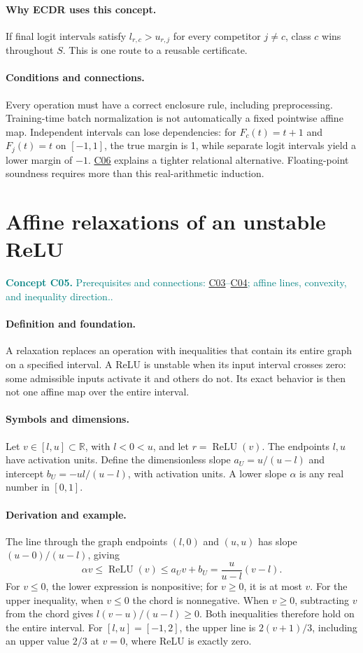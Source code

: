 \documentclass[11pt,a4paper]{article}
\newcommand{\R}{\mathbb R}
\newcommand{\relu}{\operatorname{ReLU}}
\newcommand{\conceptid}{Front matter}
\newcommand{\concept}[3]{\clearpage\renewcommand{\conceptid}{#1}%
\section{#2}\label{concept:#1}%
\textcolor{teal}{\textbf{Concept #1.} Prerequisites and connections: #3.}\par
\typeout{ECDR-CONCEPT-START #1 PAGE=\thepage}}
\begin{document}
\paragraph{Why ECDR uses this concept.}
If final logit intervals satisfy $l_{r,c}>u_{r,j}$ for every competitor $j\ne c$, class $c$ wins throughout $S$. This is one route to a reusable certificate.
\paragraph{Conditions and connections.}
Every operation must have a correct enclosure rule, including preprocessing. Training-time batch normalization is not automatically a fixed pointwise affine map. Independent intervals can lose dependencies: for $F_c(t)=t+1$ and $F_j(t)=t$ on $[-1,1]$, the true margin is 1, while separate logit intervals yield a lower margin of $-1$. \hyperref[concept:C06]{C06} explains a tighter relational alternative. Floating-point soundness requires more than this real-arithmetic induction.
\par\label{endconcept:C04}

\concept{C05}{Affine relaxations of an unstable ReLU}{\hyperref[concept:C03]{C03}--\hyperref[concept:C04]{C04}; affine lines, convexity, and inequality direction.}
\paragraph{Definition and foundation.}
A relaxation replaces an operation with inequalities that contain its entire graph on a specified interval. A ReLU is unstable when its input interval crosses zero: some admissible inputs activate it and others do not. Its exact behavior is then not one affine map over the entire interval.
\paragraph{Symbols and dimensions.}
Let $v\in[l,u]\subset\R$, with $l<0<u$, and let $r=\relu(v)$. The endpoints $l,u$ have activation units. Define the dimensionless slope $a_U=u/(u-l)$ and intercept $b_U=-ul/(u-l)$, with activation units. A lower slope $\alpha$ is any real number in $[0,1]$.
\paragraph{Derivation and example.}
The line through the graph endpoints $(l,0)$ and $(u,u)$ has slope $(u-0)/(u-l)$, giving
\[
 \alpha v\le\relu(v)\le a_Uv+b_U
 =\frac{u}{u-l}(v-l).
\]
For $v\le0$, the lower expression is nonpositive; for $v\ge0$, it is at most $v$. For the upper inequality, when $v\le0$ the chord is nonnegative. When $v\ge0$, subtracting $v$ from the chord gives $l(v-u)/(u-l)\ge0$. Both inequalities therefore hold on the entire interval.
For $[l,u]=[-1,2]$, the upper line is $2(v+1)/3$, including an upper value $2/3$ at $v=0$, where ReLU is exactly zero.
\end{document}
